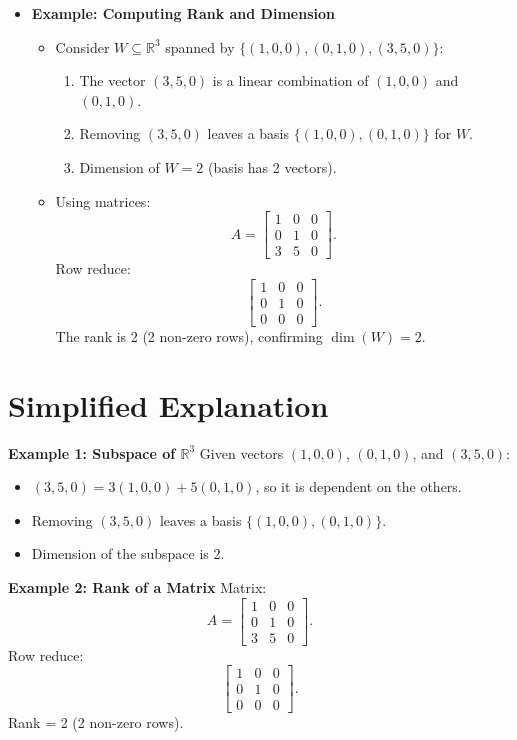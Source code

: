 \documentclass{article}
\begin{document}
\begin{itemize}
  \item \textbf{Example: Computing Rank and Dimension}
    \begin{itemize}
      \item Consider $W \subseteq \mathbb{R}^3$ spanned by $\{(1, 0, 0), (0, 1, 0), (3, 5, 0)\}$:
        \begin{enumerate}
          \item The vector $(3, 5, 0)$ is a linear combination of $(1, 0, 0)$ and $(0, 1, 0)$.
          \item Removing $(3, 5, 0)$ leaves a basis $\{(1, 0, 0), (0, 1, 0)\}$ for $W$.
          \item Dimension of $W = 2$ (basis has 2 vectors).
        \end{enumerate}
      \item Using matrices:
        \[
          A =
          \begin{bmatrix}
            1 & 0 & 0 \\
            0 & 1 & 0 \\
            3 & 5 & 0
          \end{bmatrix}.
        \]
        Row reduce:
        \[
          \begin{bmatrix}
            1 & 0 & 0 \\
            0 & 1 & 0 \\
            0 & 0 & 0
          \end{bmatrix}.
        \]
        The rank is 2 (2 non-zero rows), confirming $\dim(W) = 2$.
    \end{itemize}
\end{itemize}

\section*{Simplified Explanation}

\textbf{Example 1: Subspace of $\mathbb{R}^3$}
Given vectors $(1, 0, 0)$, $(0, 1, 0)$, and $(3, 5, 0)$:
\begin{itemize}
  \item $(3, 5, 0) = 3(1, 0, 0) + 5(0, 1, 0)$, so it is dependent on the others.
  \item Removing $(3, 5, 0)$ leaves a basis $\{(1, 0, 0), (0, 1, 0)\}$.
  \item Dimension of the subspace is 2.
\end{itemize}

\textbf{Example 2: Rank of a Matrix}
Matrix:
\[
  A =
  \begin{bmatrix}
    1 & 0 & 0 \\
    0 & 1 & 0 \\
    3 & 5 & 0
  \end{bmatrix}.
\]
Row reduce:
\[
  \begin{bmatrix}
    1 & 0 & 0 \\
    0 & 1 & 0 \\
    0 & 0 & 0
  \end{bmatrix}.
\]
Rank = 2 (2 non-zero rows).
\end{document}
